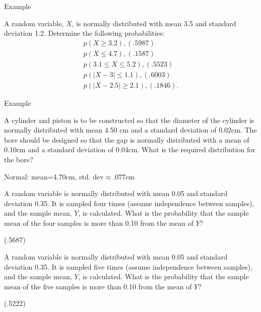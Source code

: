 \begin{frame}{Example}
  
  A random variable, $X$, is normally distributed with mean 3.5 and
  standard deviation 1.2. Determine the following probabilities:
  \begin{eqnarray*}
    p(X \geq 3.2), (.5987)\\
    p(X \leq 4.7), (.1587) \\
    p(3.1 \leq X \leq 5.2),  (.5523)\\
    p(|X-3| \leq 1.1), (.6003)\\
    p(|X-2.5| \geq 2.1), (.1846).
  \end{eqnarray*}
  
\end{frame}

\begin{frame}{Example}

  A cylinder and piston is to be constructed so that the diameter of
  the cylinder is normally distributed with mean 4.50 cm and a
  standard deviation of 0.02cm. The bore should be designed so that
  the gap is normally distributed with a mean of 0.10cm and a standard
  deviation of 0.04cm. What is the required distribution for the bore?

  \vfill
  
  Normal: mean=4.70cm, std. dev$\approx$.077cm
  
\end{frame}

\begin{frame}
  A random variable is normally distributed with mean 0.05 and
  standard deviation 0.35. It is sampled four times (assume
  independence between samples), and the sample mean, $Y$, is
  calculated. What is the probability that the sample mean of the four
  samples is more than 0.10 from the mean of $Y$?

  \vfill

  (.5687)

\end{frame}


\begin{frame}
  A random variable is normally distributed with mean 0.05 and
  standard deviation 0.35. It is sampled five times (assume
  independence between samples), and the sample mean, $Y$, is
  calculated. What is the probability that the sample mean of the five
  samples is more than 0.10 from the mean of $Y$?

  \vfill

  (.5222)
\end{frame}


